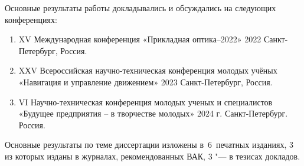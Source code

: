 {\probation}
Основные результаты работы докладывались и обсуждались на следующих конференциях:
\begin{enumerate}
	\item XV Международная конференция «Прикладная оптика–2022» 2022 Санкт-Петербург, Россия.
	\item XХV Всероссийская научно-техническая конференция молодых учёных «Навигация и управление движением» 2023 Санкт-Петербург, Россия.
	\item VI Научно-техническая конференция молодых ученых и специалистов «Будущее предприятия – в творчестве молодых» 2024 г. Санкт-Петербург. Россия.
\end{enumerate}

{\publications} Основные результаты по теме диссертации изложены
в~6~печатных изданиях,
3 из которых изданы в журналах, рекомендованных ВАК,
3 "--- в тезисах докладов.

